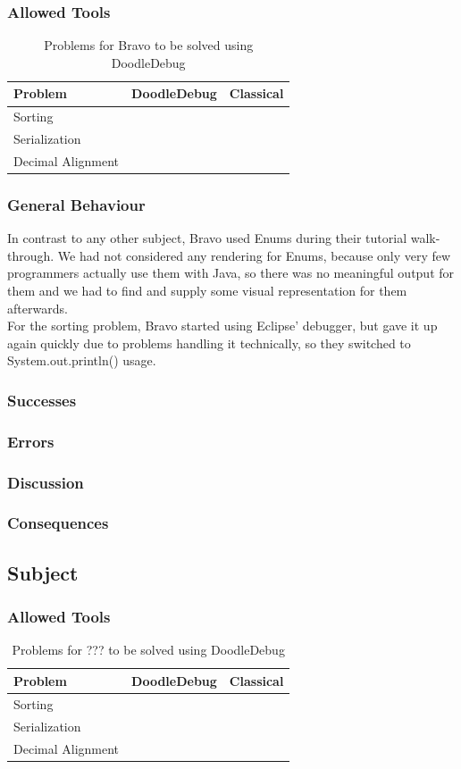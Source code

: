 \documentclass{acm_proc_article-sp}
\newcommand{\tick}{\ding{51}}
\begin{document}
\subsubsection{Allowed Tools}
\begin{table}[h]
\centering
\begin{tabular}{l c c}
{\bf Problem} & {\bf DoodleDebug} & {\bf Classical} \\ \hline
Sorting &  & \tick \\
Serialization & \tick &  \\
Decimal Alignment &  & \tick \\
\end{tabular}
\caption{Problems for Bravo to be solved using DoodleDebug}
\end{table}
\subsubsection{General Behaviour}
In contrast to any other subject, Bravo used Enums during their tutorial walk-through. We had not considered any rendering for Enums, because only very few programmers actually use them with Java, so there was no meaningful output for them and we had to find and supply some visual representation for them afterwards.\\
For the sorting problem, Bravo started using Eclipse' debugger, but gave it up again quickly due to problems handling it technically, so they switched to System.out.println() usage.
\subsubsection{Successes}
\subsubsection{Errors}
\subsubsection{Discussion}
\subsubsection{Consequences}

\subsection{Subject}
\subsubsection{Allowed Tools}
\begin{table}[h]
\centering
\begin{tabular}{l c c}
{\bf Problem} & {\bf DoodleDebug} & {\bf Classical} \\ \hline
Sorting &  &  \\
Serialization &  &  \\
Decimal Alignment &  &  \\
\end{tabular}
\caption{Problems for ??? to be solved using DoodleDebug}
\end{table}
\end{document}

